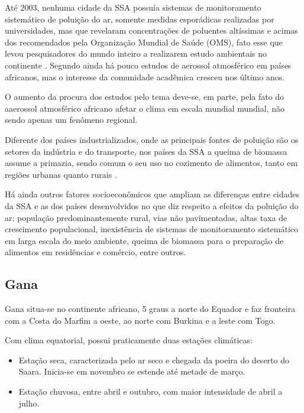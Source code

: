 Até 2003, nenhuma cidade da SSA possuía sistemas de monitoramento 
sistemático de poluição do ar, somente medidas esporádicas realizadas
por universidades, mas que revelaram concentrações de poluentes altíssimas e 
acimas dos recomendados pela Organização Mundial de Saúde (OMS),
fato esse que levou pesquisadores do mundo inteiro a 
realizarem estudo ambientais no continente \citep{EZZATI2004}. 
Segundo \cite{aboh2009} ainda há pouco estudos de aerossol atmosférico 
em países africanos, mas o interesse da comunidade acadêmica cresceu
nos último anos.
 
O aumento da procura dos estudos pelo tema deve-se, em parte, 
pela fato do aaerossol atmosférico africano afetar o clima 
em escala mundial mundial, não sendo apenas um fenômeno regional.

Diferente dos países industrializados, onde as principais fontes de poluição 
são os setores da indústria e do transporte, nos países da SSA a 
queima de biomassa assume a primazia, sendo comum o seu uso no cozimento 
de alimentos, tanto em regiões urbanas quanto rurais \citep{SMITH2004}. 

Há ainda outros fatores socioeconômicos que ampliam as diferenças entre
cidades da SSA e as dos países desenvolvidos no que diz respeito
a efeitos da poluição do ar: população predominantemente rural,
vias não pavimentadas, altas taxa de crescimento populacional,
inexistência de sistemas de monitoramento sistemático em larga escala do meio 
ambiente, queima de biomassa para o preparação de alimentos em 
residências e comércio, entre outros. 

\subsection{Gana}

Gana situa-se no continente africano, 5 graus a norte do Equador e 
faz fronteira com a Costa do Marfim a oeste, ao norte com Burkina
e a leste com Togo. 

Com clima equatorial, possui praticamente duas estações climáticas:

\begin{itemize}
  \item Estação seca, caracterizada pelo ar seco e chegada da poeira do deserto 
        do Saara. Inicia-se em novembro se estende até metade de março.
  \item Estação chuvosa, entre abril e outubro, com maior intensidade de abril a
        julho.
\end{itemize}

